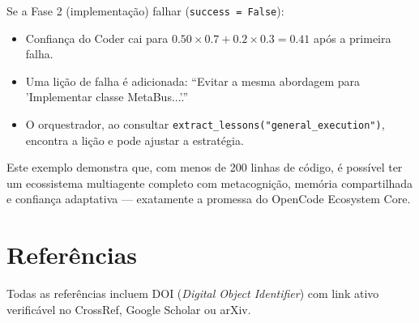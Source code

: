 Se a Fase 2 (implementação) falhar (\texttt{success = False}):

\begin{itemize}
    \item Confiança do Coder cai para $0.50 \times 0.7 + 0.2 \times 0.3 = 0.41$ após a primeira falha.
    \item Uma lição de falha é adicionada: ``Evitar a mesma abordagem para 'Implementar classe MetaBus...'.''
    \item O orquestrador, ao consultar \texttt{extract\_lessons("general\_execution")}, encontra a lição e pode ajustar a estratégia.
\end{itemize}

Este exemplo demonstra que, com menos de 200 linhas de código, é possível ter um ecossistema multiagente completo com metacognição, memória compartilhada e confiança adaptativa — exatamente a promessa do OpenCode Ecosystem Core.


\section{Referências}
\label{sec:referencias}

Todas as referências incluem DOI (\textit{Digital Object Identifier}) com link ativo verificável no CrossRef, Google Scholar ou arXiv.

